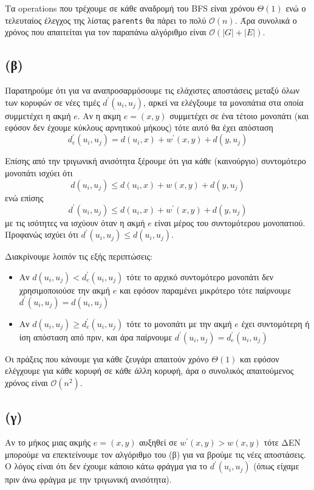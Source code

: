 \documentclass[a4paper,11pt]{article}
\begin{document}
Τα operations που τρέχουμε σε κάθε αναδρομή του BFS είναι χρόνου $\Theta(1)$ ενώ ο τελευταίος έλεγχος της λίστας \verb|parents| θα πάρει το πολύ $\mathcal{O}(n)$. Άρα συνολικά ο χρόνος που απαιτείται για τον παραπάνω αλγόριθμο είναι $\mathcal{O}(|G|+|E|)$.

\subsection*{(β)}
Παρατηρούμε ότι για να αναπροσαρμόσουμε τις ελάχιστες αποστάσεις μεταξύ όλων των κορυφών σε νέες τιμές $d^\prime(u_i,u_j)$, αρκεί να ελέγξουμε τα μονοπάτια στα οποία συμμετέχει η ακμή $e$. Αν η ακμη $e = (x,y)$ συμμετέχει σε ένα τέτοιο μονοπάτι (και εφόσον δεν έχουμε κύκλους αρνητικού μήκους) τότε αυτό θα έχει απόσταση
$$d_e^\prime(u_i,u_j) = d(u_i,x) + w^\prime(x,y) + d(y,u_j)$$

Επίσης από την τριγωνική ανισότητα ξέρουμε ότι για κάθε (καινούργιο) συντομότερο μονοπάτι ισχύει ότι
$$d(u_i,u_j) \leq d(u_i,x) + w(x,y) + d(y,u_j)$$
ενώ επίσης
$$d^\prime(u_i,u_j) \leq d(u_i,x) + w^\prime(x,y) + d(y,u_j)$$
με τις ισότητες να ισχύουν όταν η ακμή $e$ είναι μέρος του συντομότερου μονοπατιού. Προφανώς ισχύει ότι $d^\prime(u_i,u_j) \leq d(u_i,u_j)$.

Διακρίνουμε λοιπόν τις εξής περιπτώσεις:
\begin{itemize}
  \item Αν $d(u_i,u_j) < d_e^\prime(u_i,u_j)$ τότε το αρχικό συντομότερο μονοπάτι δεν χρησιμοποιούσε την ακμή $e$ και εφόσον παραμένει μικρότερο τότε παίρνουμε $d^\prime(u_i,u_j) = d(u_i,u_j)$
  \item Αν $d(u_i,u_j) \geq d_e^\prime(u_i,u_j)$ τότε το μονοπάτι με την ακμή $e$ έχει συντομότερη ή ίση απόσταση από πριν, και άρα παίρνουμε $d^\prime(u_i,u_j) = d_e^\prime(u_i,u_j)$
\end{itemize}
  
Οι πράξεις που κάνουμε για κάθε ζευγάρι απαιτούν χρόνο $\Theta(1)$ και εφόσον ελέγχουμε για κάθε κορυφή σε κάθε άλλη κορυφή, άρα ο συνολικός απαιτούμενος χρόνος είναι $\mathcal{O}(n^2)$.

\subsection*{(γ)}
Αν το μήκος μιας ακμής $e = (x,y)$ αυξηθεί σε $w^\prime(x,y) > w(x,y)$ τότε ΔΕΝ μπορούμε να επεκτείνουμε τον αλγόριθμο του (β) για να βρούμε τις νέες αποστάσεις. Ο λόγος είναι ότι δεν έχουμε κάποιο κάτω φράγμα για το $d^\prime(u_i,u_j)$ (όπως είχαμε πριν άνω φράγμα με την τριγωνική ανισότητα).
\end{document}
